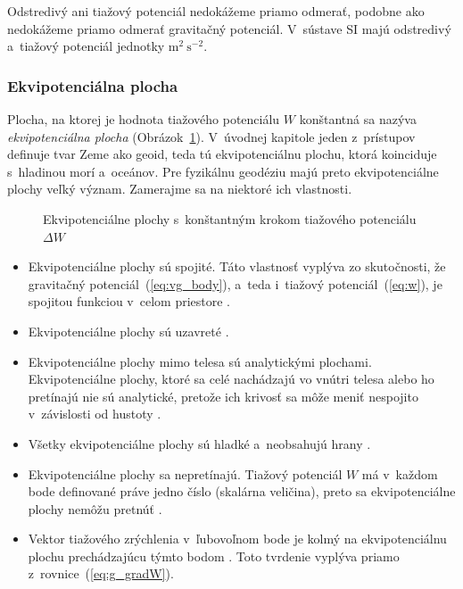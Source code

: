 \documentclass[a4paper, 12pt]{book}
\begin{document}
Odstredivý ani tiažový potenciál nedokážeme priamo odmerať, podobne ako
nedokážeme priamo odmerať gravitačný potenciál.  V~sústave SI majú odstredivý
a~tiažový potenciál jednotky $\mathrm{m}^2 \ \mathrm{s}^{-2}$.

\subsubsection{Ekvipotenciálna plocha}

Plocha, na ktorej je hodnota tiažového potenciálu $W$ konštantná sa nazýva
\emph{ekvipotenciálna plocha} (Obrázok~\ref{fig:equipotential_surfaces}).
V~úvodnej kapitole jeden z~prístupov definuje tvar Zeme ako geoid, teda tú
ekvipotenciálnu plochu, ktorá koinciduje s~hladinou morí a~oceánov.  Pre
fyzikálnu geodéziu majú preto ekvipotenciálne plochy veľký význam.  Zamerajme
sa na niektoré ich vlastnosti.

\begin{figure}
\centering

\caption{Ekvipotenciálne plochy s~konštantným krokom tiažového potenciálu
$\Delta W$}
\label{fig:equipotential_surfaces}
\end{figure}

\begin{itemize}
\item Ekvipotenciálne plochy sú spojité.  Táto vlastnosť vyplýva zo
skutočnosti, že gravitačný potenciál~(\ref{eq:vg_body}), a~teda i~tiažový
potenciál~(\ref{eq:w}), je spojitou funkciou v~celom priestore
\citep{Janak2006}.

\item Ekvipotenciálne plochy sú uzavreté \citep{VanicekGeodesy}.

\item Ekvipotenciálne plochy mimo telesa sú analytickými plochami.
Ekvipotenciálne plochy, ktoré sa celé nachádzajú vo vnútri telesa alebo ho
pretínajú nie sú analytické, pretože ich krivosť sa môže meniť nespojito
v~závislosti od hustoty \citep{MoritzPhysicalGeodesy}.

\item Všetky ekvipotenciálne plochy sú hladké a~neobsahujú hrany
\citep{MoritzPhysicalGeodesy}.

\item Ekvipotenciálne plochy sa nepretínajú.  Tiažový potenciál $W$ má v~každom
bode definované práve jedno číslo (skalárna veličina), preto sa ekvipotenciálne
plochy nemôžu pretnúť \citep{MacMillan1930}.

\item Vektor tiažového zrýchlenia v~ľubovoľnom bode je kolmý na ekvipotenciálnu
plochu prechádzajúcu týmto bodom \citep{MoritzPhysicalGeodesy}.  Toto tvrdenie
vyplýva priamo z~rovnice~(\ref{eq:g_gradW}).
\end{itemize}
\end{document}
